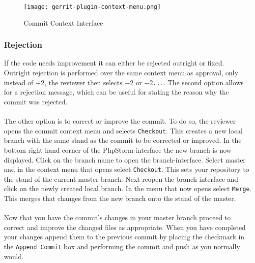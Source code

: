 \begin{figure}[h] 
	\centering
	\texttt{[image: gerrit-plugin-context-menu.png]}
	\caption{Commit Context Interface}
	\label{fig:gerrit-plugin-context-menu}
\end{figure}

\subsubsection{Rejection}

If the code needs improvement it can either be rejected outright or fixed. Outright rejection is performed over the same context menu as approval, only instead of \texttt{$+2$}, the reviewer then selects \texttt{$-2$} or \texttt{$-2$...}. The second option allows for a rejection message, which can be useful for stating the reason why the commit was rejected.\\
\\
The other option is to correct or improve the commit. To do so, the reviewer opens the commit context menu and selects \texttt{Checkout}. This creates a new local branch with the same stand as the commit to be corrected or improved. In the bottom right hand corner of the PhpStorm interface the new branch is now displayed. Click on the branch name to open the branch-interface. Select master and in the context menu that opens select \texttt{Checkout}. This sets your repository to the stand of the current master branch. Next reopen the branch-interface and click on the newly created local branch. In the menu that now opens select \texttt{Merge}. This merges that changes from the new branch onto the stand of the master.\\
\\
Now that you have the commit's changes in your master branch proceed to correct and improve the changed files as appropriate. When you have completed your changes append them to the previous commit by placing the checkmark in the \texttt{Append Commit} box and performing the commit and push as you normally would.

